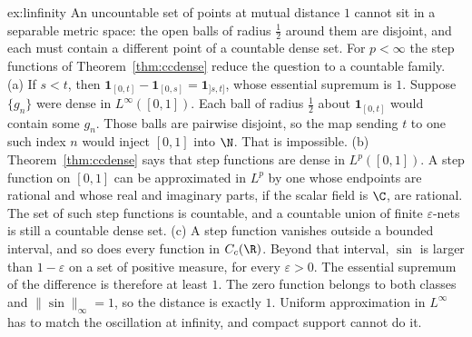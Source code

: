 \begin{solution}{ex:linfinity}
\idea An uncountable set of points at mutual distance $1$ cannot sit in a separable metric space: the open balls of radius $\frac12$ around them are disjoint, and each must contain a different point of a countable dense set. For $p<\infty$ the step functions of Theorem~\ref{thm:ccdense} reduce the question to a countable family.
\writeup (a) If $s<t$, then $\mathbf 1_{[0,t]}-\mathbf 1_{[0,s]}=\mathbf 1_{]s,t]}$, whose essential supremum is $1$. Suppose $\{g_n\}$ were dense in $L^\infty([0,1])$. Each ball of radius $\frac12$ about $\mathbf 1_{[0,t]}$ would contain some $g_n$. Those balls are pairwise disjoint, so the map sending $t$ to one such index $n$ would inject $[0,1]$ into $\N$. That is impossible. (b) Theorem~\ref{thm:ccdense} says that step functions are dense in $L^p([0,1])$. A step function on $[0,1]$ can be approximated in $L^p$ by one whose endpoints are rational and whose real and imaginary parts, if the scalar field is $\C$, are rational. The set of such step functions is countable, and a countable union of finite $\varepsilon$-nets is still a countable dense set. (c) A step function vanishes outside a bounded interval, and so does every function in $C_c(\R)$. Beyond that interval, $\sin$ is larger than $1-\varepsilon$ on a set of positive measure, for every $\varepsilon>0$. The essential supremum of the difference is therefore at least $1$. The zero function belongs to both classes and $\|\sin\|_\infty=1$, so the distance is exactly $1$. Uniform approximation in $L^\infty$ has to match the oscillation at infinity, and compact support cannot do it.
\end{solution}

